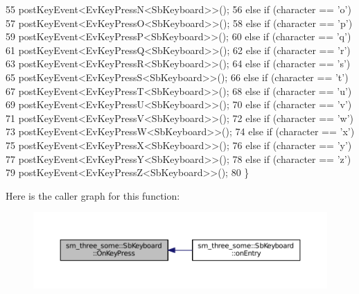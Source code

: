 \begin{DoxyCode}
55                         postKeyEvent<EvKeyPressN<SbKeyboard>>();
56                 \textcolor{keywordflow}{else} \textcolor{keywordflow}{if} (character == \textcolor{charliteral}{'o'})
57                         postKeyEvent<EvKeyPressO<SbKeyboard>>();
58                 \textcolor{keywordflow}{else} \textcolor{keywordflow}{if} (character == \textcolor{charliteral}{'p'})
59                         postKeyEvent<EvKeyPressP<SbKeyboard>>();
60                 \textcolor{keywordflow}{else} \textcolor{keywordflow}{if} (character == \textcolor{charliteral}{'q'})
61                         postKeyEvent<EvKeyPressQ<SbKeyboard>>();
62                 \textcolor{keywordflow}{else} \textcolor{keywordflow}{if} (character == \textcolor{charliteral}{'r'})
63                         postKeyEvent<EvKeyPressR<SbKeyboard>>();
64                 \textcolor{keywordflow}{else} \textcolor{keywordflow}{if} (character == \textcolor{charliteral}{'s'})
65                         postKeyEvent<EvKeyPressS<SbKeyboard>>();
66                 \textcolor{keywordflow}{else} \textcolor{keywordflow}{if} (character == \textcolor{charliteral}{'t'})
67                         postKeyEvent<EvKeyPressT<SbKeyboard>>();
68                 \textcolor{keywordflow}{else} \textcolor{keywordflow}{if} (character == \textcolor{charliteral}{'u'})
69                         postKeyEvent<EvKeyPressU<SbKeyboard>>();
70                 \textcolor{keywordflow}{else} \textcolor{keywordflow}{if} (character == \textcolor{charliteral}{'v'})
71                         postKeyEvent<EvKeyPressV<SbKeyboard>>();
72                 \textcolor{keywordflow}{else} \textcolor{keywordflow}{if} (character == \textcolor{charliteral}{'w'})
73                         postKeyEvent<EvKeyPressW<SbKeyboard>>();
74                 \textcolor{keywordflow}{else} \textcolor{keywordflow}{if} (character == \textcolor{charliteral}{'x'})
75                         postKeyEvent<EvKeyPressX<SbKeyboard>>();
76                 \textcolor{keywordflow}{else} \textcolor{keywordflow}{if} (character == \textcolor{charliteral}{'y'})
77                         postKeyEvent<EvKeyPressY<SbKeyboard>>();
78                 \textcolor{keywordflow}{else} \textcolor{keywordflow}{if} (character == \textcolor{charliteral}{'z'})
79                         postKeyEvent<EvKeyPressZ<SbKeyboard>>();
80         \}
\end{DoxyCode}


Here is the caller graph for this function\+:
\nopagebreak
\begin{figure}[H]
\begin{center}
\leavevmode
\includegraphics[width=350pt]{classsm__three__some_1_1SbKeyboard_a486cad3628282fc8414afff3d3c6e2dc_icgraph}
\end{center}
\end{figure}


